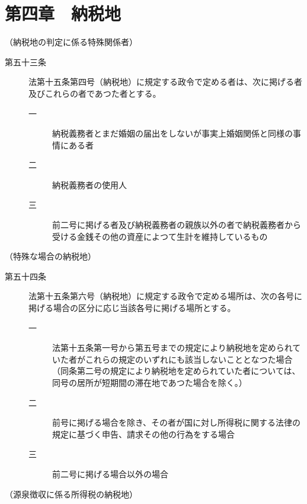 \documentclass[twocolumn,a4j,10pt]{ltjtarticle}
\begin{document}
\section*{第四章　納税地}
\noindent\hspace{10pt}（納税地の判定に係る特殊関係者）
\begin{description}
\item[第五十三条]法第十五条第四号（納税地）に規定する政令で定める者は、次に掲げる者及びこれらの者であつた者とする。
\begin{description}
\item[一]納税義務者とまだ婚姻の届出をしないが事実上婚姻関係と同様の事情にある者
\item[二]納税義務者の使用人
\item[三]前二号に掲げる者及び納税義務者の親族以外の者で納税義務者から受ける金銭その他の資産によつて生計を維持しているもの
\end{description}
\end{description}
\noindent\hspace{10pt}（特殊な場合の納税地）
\begin{description}
\item[第五十四条]法第十五条第六号（納税地）に規定する政令で定める場所は、次の各号に掲げる場合の区分に応じ当該各号に掲げる場所とする。
\begin{description}
\item[一]法第十五条第一号から第五号までの規定により納税地を定められていた者がこれらの規定のいずれにも該当しないこととなつた場合（同条第二号の規定により納税地を定められていた者については、同号の居所が短期間の滞在地であつた場合を除く。）
\item[二]前号に掲げる場合を除き、その者が国に対し所得税に関する法律の規定に基づく申告、請求その他の行為をする場合
\item[三]前二号に掲げる場合以外の場合
\end{description}
\end{description}
\noindent\hspace{10pt}（源泉徴収に係る所得税の納税地）
\end{document}
